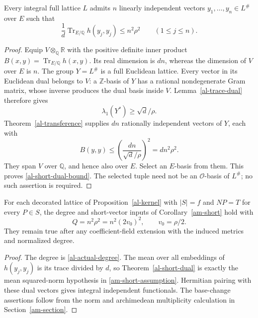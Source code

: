 \begin{theorem}\label{al-short-dual}
Every integral full lattice $L$ admits $n$ linearly independent
vectors $y_1,\ldots,y_n\in L^\#$ over $E$ such that
\begin{equation}\label{al-short-dual-bound}
       \frac1d\operatorname{Tr}_{E/\mathbb Q}h(y_j,y_j)
                                \leq n^2\rho^2\qquad(1\leq j\leq n).
\end{equation}
\end{theorem}
\begin{proof}
Equip $V\otimes_{\mathbb Q}\mathbb R$ with the positive definite
inner product $B(x,y)=\operatorname{Tr}_{E/\mathbb Q}h(x,y)$.
Its real dimension is $dn$, whereas the dimension of $V$ over
$E$ is $n$. The group $Y=L^\#$ is a full Euclidean lattice.
Every vector in its Euclidean dual belongs to $V$: a
$\mathbb Z$-basis of $Y$ has a rational nondegenerate Gram matrix,
whose inverse produces the dual basis inside $V$.
Lemma~\ref{al-trace-dual} therefore gives
\[
                     \lambda_1(Y^*)\geq\sqrt d/\rho.
\]
Theorem~\ref{al-transference} supplies $dn$ rationally independent
vectors of $Y$, each with
\[
 B(y,y)\leq\left(\frac{dn}{\sqrt d/\rho}\right)^2
                                                =dn^2\rho^2.
\]
They span $V$ over $\mathbb Q$, and hence also over $E$.
Select an $E$-basis from them. This proves
\eqref{al-short-dual-bound}. The selected tuple need not be an
$\mathcal O$-basis of $L^\#$; no such assertion is required.
\end{proof}

\begin{corollary}
\label{al-coefficient-input}
For each decorated lattice of Proposition~\ref{al-kernel} with
$|S|=f$ and $NP=T$ for every $P\in S$, the degree and short-vector
inputs of Corollary~\ref{am-short} hold with
\[
                  Q=n^2\rho^2=n^2(2v_0)^2,
                         \qquad v_0=\rho/2.
\]
They remain true after any coefficient-field extension with
the induced metrics and normalized degree.
\end{corollary}
\begin{proof}
The degree is \eqref{al-actual-degree}. The mean over all
embeddings of $h(y_j,y_j)$ is its trace divided by $d$,
so Theorem~\ref{al-short-dual} is exactly the mean squared-norm
hypothesis in \eqref{am-short-assumption}. Hermitian pairing
with these dual vectors gives integral independent functionals.
The base-change assertions follow from the norm and archimedean
multiplicity calculation in Section~\ref{am-section}.
\end{proof}


